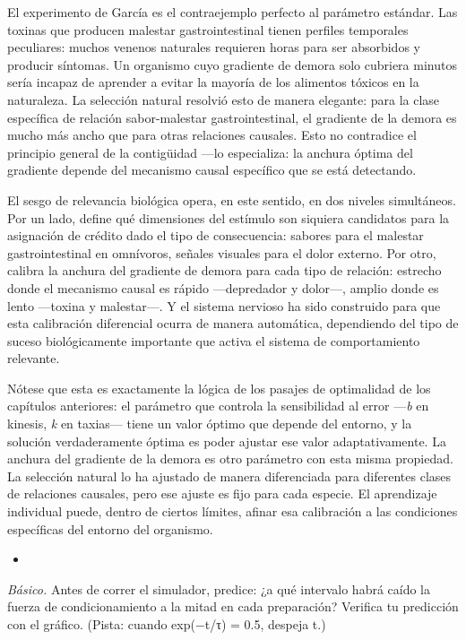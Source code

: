 \documentclass[
  letterpaper,
  DIV=11,
  numbers=noendperiod]{scrreprt}
\providecommand{\tightlist}{%
  \setlength{\itemsep}{0pt}\setlength{\parskip}{0pt}}
\begin{document}
\begin{tcolorbox}[enhanced jigsaw, toprule=.15mm, arc=.35mm, colback=white, opacityback=0, colframe=quarto-callout-note-color-frame, breakable, rightrule=.15mm, left=2mm, leftrule=.75mm, bottomrule=.15mm]
El experimento de García es el contraejemplo perfecto al parámetro
estándar. Las toxinas que producen malestar gastrointestinal tienen
perfiles temporales peculiares: muchos venenos naturales requieren horas
para ser absorbidos y producir síntomas. Un organismo cuyo gradiente de
demora solo cubriera minutos sería incapaz de aprender a evitar la
mayoría de los alimentos tóxicos en la naturaleza. La selección natural
resolvió esto de manera elegante: para la clase específica de relación
sabor-malestar gastrointestinal, el gradiente de la demora es mucho más
ancho que para otras relaciones causales. Esto no contradice el
principio general de la contigüidad ---lo especializa: la anchura óptima
del gradiente depende del mecanismo causal específico que se está
detectando.

El sesgo de relevancia biológica opera, en este sentido, en dos niveles
simultáneos. Por un lado, define qué dimensiones del estímulo son
siquiera candidatos para la asignación de crédito dado el tipo de
consecuencia: sabores para el malestar gastrointestinal en omnívoros,
señales visuales para el dolor externo. Por otro, calibra la anchura del
gradiente de demora para cada tipo de relación: estrecho donde el
mecanismo causal es rápido ---depredador y dolor---, amplio donde es
lento ---toxina y malestar---. Y el sistema nervioso ha sido construido
para que esta calibración diferencial ocurra de manera automática,
dependiendo del tipo de suceso biológicamente importante que activa el
sistema de comportamiento relevante.

Nótese que esta es exactamente la lógica de los pasajes de optimalidad
de los capítulos anteriores: el parámetro que controla la sensibilidad
al error ---\emph{b} en kinesis, \emph{k} en taxias--- tiene un valor
óptimo que depende del entorno, y la solución verdaderamente óptima es
poder ajustar ese valor adaptativamente. La anchura del gradiente de la
demora es otro parámetro con esta misma propiedad. La selección natural
lo ha ajustado de manera diferenciada para diferentes clases de
relaciones causales, pero ese ajuste es fijo para cada especie. El
aprendizaje individual puede, dentro de ciertos límites, afinar esa
calibración a las condiciones específicas del entorno del organismo.

\begin{itemize}
\tightlist
\item
\end{itemize}

\emph{Básico.} Antes de correr el simulador, predice: ¿a qué intervalo
habrá caído la fuerza de condicionamiento a la mitad en cada
preparación? Verifica tu predicción con el gráfico. (Pista: cuando
exp(−t/τ) = 0.5, despeja t.)


\end{tcolorbox}
\end{document}
